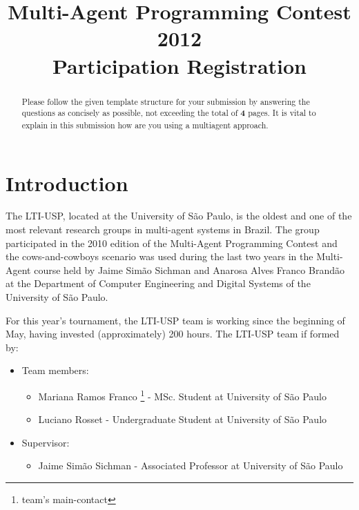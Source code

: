\documentclass{llncs}
\begin{document}
\title{Multi-Agent Programming Contest 2012\\Participation Registration}
\author{}
\institute{}
\maketitle

\begin{abstract}
  Please follow the given template structure for your submission by
  answering the questions as concisely as possible, not exceeding the
  total of \textbf{4} pages. It is vital to explain in this submission
  how are you using a multiagent approach.


\end{abstract}


\section*{Introduction}

The LTI-USP, located at the University of S\~ao Paulo, is the oldest and
one of the most relevant research groups in multi-agent systems in Brazil.
The group participated in the 2010 edition of the Multi-Agent Programming Contest
and the cows-and-cowboys scenario was used during the last two years in the Multi-Agent
course held by Jaime Sim\~ao Sichman and Anarosa Alves Franco Brand\~ao at the
Department of Computer Engineering and Digital Systems of the University of S\~ao Paulo.

For this year's tournament, the LTI-USP team is working since the beginning of May, having
invested (approximately) 200 hours. The LTI-USP team if formed by:

\begin{itemize}
\item Team members:
	\begin{itemize}
	\item Mariana Ramos Franco \footnote[1]{team's main-contact} - MSc. Student at University of S\~ao Paulo
	\item Luciano Rosset - Undergraduate Student at University of S\~ao Paulo	
	\end{itemize}
\item Supervisor:
	\begin{itemize}
	\item Jaime Sim\~ao Sichman - Associated Professor at University of S\~ao Paulo\\
	\end{itemize}
\end{itemize}
\end{document}
